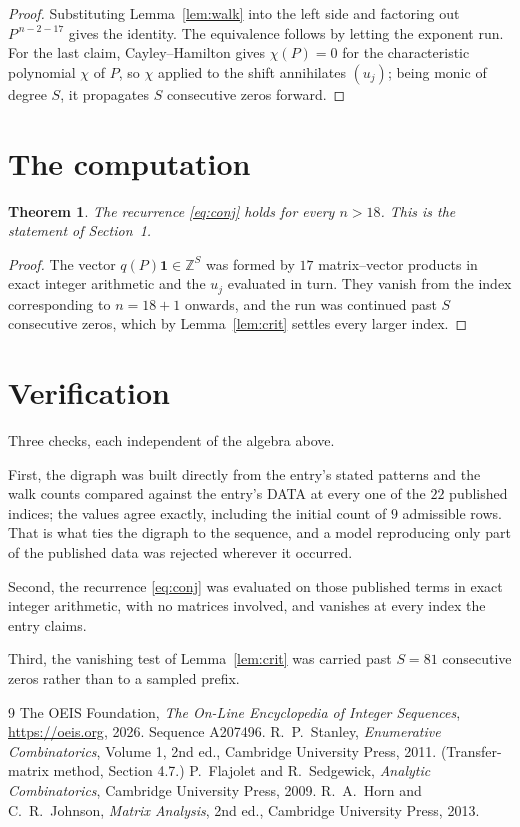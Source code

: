 \documentclass[11pt,a4paper]{article}
\theoremstyle{plain}
\newtheorem{theorem}{Theorem}
\theoremstyle{definition}
\begin{document}
\begin{proof}
Substituting Lemma~\ref{lem:walk} into the left side and factoring out
$P^{\,n-2-17}$ gives the identity. The equivalence follows by letting the exponent
run. For the last claim, Cayley--Hamilton gives $\chi(P)=0$ for the characteristic
polynomial $\chi$ of $P$, so $\chi$ applied to the shift annihilates $(u_j)$; being monic of
degree $S$, it propagates $S$ consecutive zeros forward.
\end{proof}

\section{The computation}

\begin{theorem}
The recurrence \eqref{eq:conj} holds for every $n>18$. This is the statement of
Section~1.
\end{theorem}

\begin{proof}
The vector $q(P)\mathbf{1}\in\mathbb{Z}^{S}$ was formed by $17$ matrix--vector
products in exact integer arithmetic and the $u_j$ evaluated in turn. They vanish from the
index corresponding to $n=18+1$ onwards, and the run was continued past $S$ consecutive
zeros, which by Lemma~\ref{lem:crit} settles every larger index.
\end{proof}

\section{Verification}

Three checks, each independent of the algebra above.

First, the digraph was built directly from the entry's stated patterns and the walk counts
compared against the entry's DATA at every one of the $22$ published indices; the
values agree exactly, including the initial count of $9$ admissible rows. That is
what ties the digraph to the sequence, and a model reproducing only part of the published
data was rejected wherever it occurred.

Second, the recurrence \eqref{eq:conj} was evaluated on those published terms in exact
integer arithmetic, with no matrices involved, and vanishes at every index the entry claims.

Third, the vanishing test of Lemma~\ref{lem:crit} was carried past $S=81$ consecutive
zeros rather than to a sampled prefix.

\begin{thebibliography}{9}
 The OEIS Foundation, \emph{The On-Line Encyclopedia of Integer
Sequences}, \url{https://oeis.org}, 2026. Sequence A207496.
 R.~P.~Stanley, \emph{Enumerative Combinatorics}, Volume 1, 2nd ed.,
Cambridge University Press, 2011. (Transfer-matrix method, Section 4.7.)
 P.~Flajolet and R.~Sedgewick, \emph{Analytic Combinatorics}, Cambridge
University Press, 2009.
 R.~A.~Horn and C.~R.~Johnson, \emph{Matrix Analysis}, 2nd ed., Cambridge
University Press, 2013.
\end{thebibliography}
\end{document}
